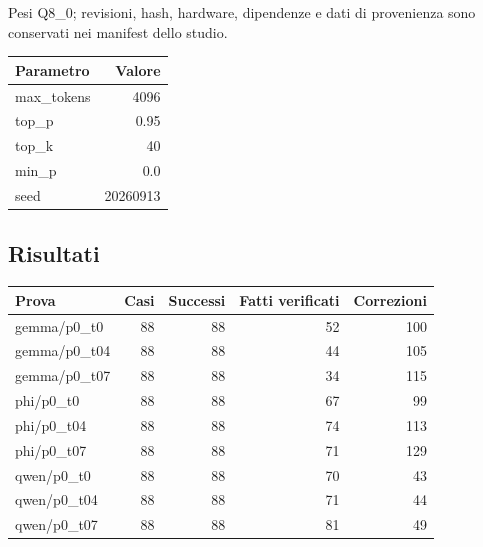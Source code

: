 Pesi Q8\_0; revisioni, hash, hardware, dipendenze e dati di provenienza sono conservati nei manifest dello studio.

\begin{center}\begin{tabular}{lr}\toprule Parametro & Valore\\\midrule

max\_tokens & 4096\\

top\_p & 0.95\\

top\_k & 40\\

min\_p & 0.0\\

seed & 20260913\\

\bottomrule\end{tabular}\end{center}

\subsection{Risultati}

\begin{center}\small\begin{tabular}{lrrrr}\toprule Prova & Casi & Successi & Fatti verificati & Correzioni\\\midrule

gemma/p0\_t0 & 88 & 88 & 52 & 100\\

gemma/p0\_t04 & 88 & 88 & 44 & 105\\

gemma/p0\_t07 & 88 & 88 & 34 & 115\\

phi/p0\_t0 & 88 & 88 & 67 & 99\\

phi/p0\_t04 & 88 & 88 & 74 & 113\\

phi/p0\_t07 & 88 & 88 & 71 & 129\\

qwen/p0\_t0 & 88 & 88 & 70 & 43\\

qwen/p0\_t04 & 88 & 88 & 71 & 44\\

qwen/p0\_t07 & 88 & 88 & 81 & 49\\

\bottomrule\end{tabular}\end{center}

